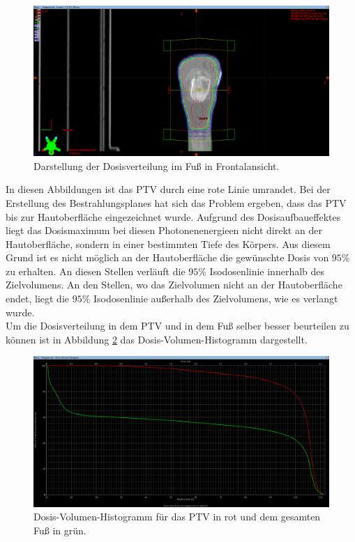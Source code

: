 \begin{figure}[H]
  \centering
  \includegraphics[width=\textwidth]{Bilder/XAnsicht.png}
  \caption{Darstellung der Dosisverteilung im Fuß in Frontalansicht.}
  \label{abb:x}
\end{figure}

In diesen Abbildungen ist das PTV durch eine rote Linie umrandet.
Bei der Erstellung des Bestrahlungsplanes hat sich das Problem ergeben, dass das PTV
bis zur Hautoberfläche eingezeichnet wurde.
Aufgrund des Dosisaufbaueffektes liegt das Dosismaximum bei diesen Photonenenergieen
nicht direkt an der Hautoberfläche, sondern in einer bestimmten Tiefe des Körpers.
Aus diesem Grund ist es nicht möglich an der Hautoberfläche die gewünschte Dosis von
$95\%$ zu erhalten. An diesen Stellen verläuft die $95\%$ Isodosenlinie innerhalb des
Zielvolumens. An den Stellen, wo das Zielvolumen nicht an der Hautoberfläche endet,
liegt die $95\%$ Isodosenlinie außerhalb des Zielvolumens, wie es verlangt wurde. \\

Um die Dosisverteilung in dem PTV und in dem Fuß selber besser beurteilen zu können
ist in Abbildung \ref{abb:DVH} das Dosis-Volumen-Histogramm dargestellt.

\begin{figure}[H]
  \centering
  \includegraphics[width=\textwidth]{Bilder/DVH.png}
  \caption{Dosis-Volumen-Histogramm für das PTV in rot und dem gesamten Fuß in grün.}
  \label{abb:DVH}
\end{figure}

